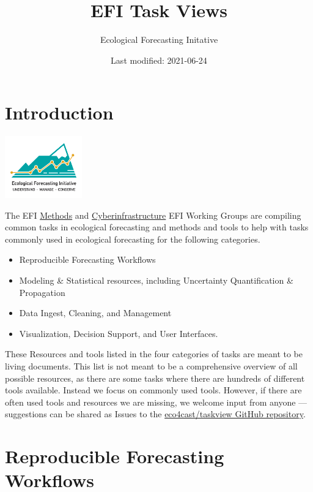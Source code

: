 \documentclass[
]{book}
\title{EFI Task Views}
\author{Ecological Forecasting Initative}
\date{Last modified: 2021-06-24}
\providecommand{\tightlist}{%
  \setlength{\itemsep}{0pt}\setlength{\parskip}{0pt}}
\begin{document}
\maketitle

{
\setcounter{tocdepth}{1}
\tableofcontents
}
\hypertarget{introduction}{%
\chapter*{Introduction}\label{introduction}}

\includegraphics[width=0.25\textwidth,height=\textheight]{images/EFI_Logo-1.jpg}

The EFI \href{https://ecoforecast.org/methods-tools/}{Methods} and \href{https://ecoforecast.org/cyberinfrastructure/}{Cyberinfrastructure} EFI Working Groups are compiling common tasks in ecological forecasting and methods and tools to help with tasks commonly used in ecological forecasting for the following categories.

\begin{itemize}
\tightlist
\item
  Reproducible Forecasting Workflows
\item
  Modeling \& Statistical resources, including Uncertainty Quantification \& Propagation
\item
  Data Ingest, Cleaning, and Management
\item
  Visualization, Decision Support, and User Interfaces.
\end{itemize}

These Resources and tools listed in the four categories of tasks are meant to be living documents. This list is not meant to be a comprehensive overview of all possible resources, as there are some tasks where there are hundreds of different tools available. Instead we focus on commonly used tools. However, if there are often used tools and resources we are missing, we welcome input from anyone --- suggestions can be shared as Issues to the \href{https://github.com/eco4cast/taskviews}{eco4cast/taskview GitHub repository}.

\hypertarget{reproducible-forecasting-workflows}{%
\chapter{Reproducible Forecasting Workflows}\label{reproducible-forecasting-workflows}}
\end{document}
